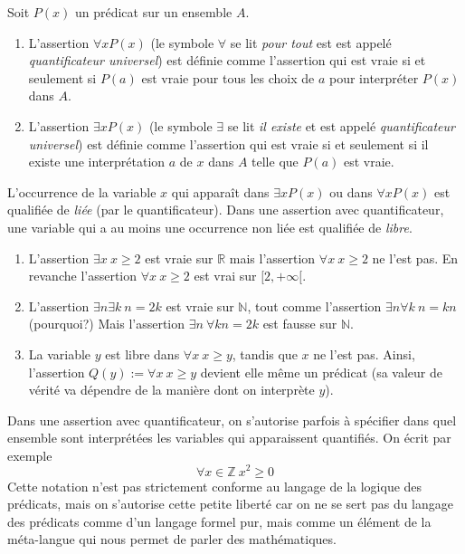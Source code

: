 \documentclass[french,course,oneside,theoremnosection]{lecture}
\newcommand{\R}{\mathbb{R}}
\newcommand{\N}{\mathbb{N}}
\newcommand{\Z}{\mathbb{Z}}
\begin{document}
\begin{definition}
Soit $P(x)$ un prédicat sur un ensemble $A$. 
\begin{enumerate}[(1)]
\item L'assertion $\forall x P(x)$ (le symbole $\forall$ se lit \emph{pour tout} est est appelé \emph{quantificateur universel}) est définie comme l'assertion qui est vraie si et seulement si $P(a)$ est vraie pour tous les choix de $a$ pour interpréter $P(x)$ dans $A$.

\item L'assertion $\exists x P(x)$ (le symbole $\exists$ se lit \emph{il existe} et est appelé \emph{quantificateur universel}) est définie comme l'assertion qui est vraie si et seulement si il existe une interprétation $a$ de $x$ dans $A$ telle que $P(a)$ est vraie.
\end{enumerate}

L’occurrence de la variable $x$ qui apparaît dans $\exists x P(x)$ ou dans $\forall x P(x)$ est qualifiée  de \emph{liée} (par le quantificateur). Dans une assertion avec quantificateur, une variable qui a au moins une occurrence non liée est qualifiée de \emph{libre}. 
\end{definition}
\begin{example}
\begin{enumerate}[(1)]
\item L'assertion $\exists x \ x\geq 2$ est vraie sur $\R$ mais l'assertion $\forall x \ x\geq 2$ ne l'est pas. En revanche l'assertion $\forall x \ x\geq 2$ est vrai sur $[2, +\infty[$.

\item L'assertion $\exists n \exists k \ n=2k$ est vraie sur $\N$, tout comme l'assertion $\exists n \forall k \ n=kn$ (pourquoi?) Mais l'assertion $\exists n\ \forall k n=2k$ est fausse sur $\N$.

\item La variable $y$ est libre dans $\forall x \ x\geq y$, tandis que $x$ ne l'est pas. Ainsi, l'assertion $Q(y):=\forall x \ x\geq y$ devient elle même un prédicat (sa valeur de vérité va dépendre de la manière dont on interprète $y$).
\end{enumerate}
\end{example}

\begin{notation}
Dans une assertion avec quantificateur, on s'autorise parfois à spécifier dans quel ensemble sont interprétées les variables qui apparaissent quantifiés. On écrit par exemple
\[
\forall x\in \Z \ x^2\geq 0
\] 
Cette notation n'est pas strictement conforme au langage de la logique des prédicats, mais on s'autorise cette petite liberté car on ne se sert pas du langage des prédicats comme d'un langage formel pur, mais comme un élément de la méta-langue qui nous permet de parler des mathématiques.
\end{notation}
\end{document}
